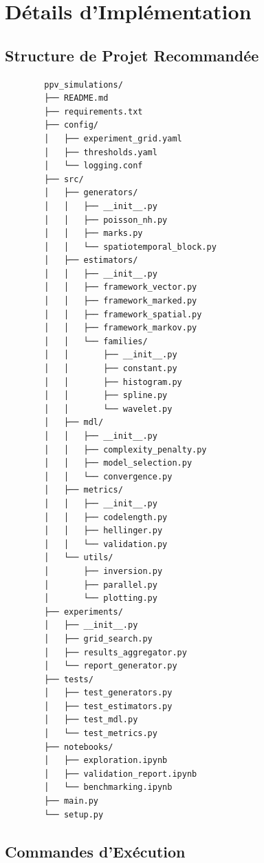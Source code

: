 \documentclass[12pt,a4paper]{article}
\begin{document}
	\section{Détails d'Implémentation}
	\label{sec:implementation}
	
	\subsection{Structure de Projet Recommandée}
	\label{subsec:structure_projet}
	
	\begin{verbatim}
		ppv_simulations/
		├── README.md
		├── requirements.txt
		├── config/
		│   ├── experiment_grid.yaml
		│   ├── thresholds.yaml
		│   └── logging.conf
		├── src/
		│   ├── generators/
		│   │   ├── __init__.py
		│   │   ├── poisson_nh.py
		│   │   ├── marks.py
		│   │   └── spatiotemporal_block.py
		│   ├── estimators/
		│   │   ├── __init__.py
		│   │   ├── framework_vector.py
		│   │   ├── framework_marked.py
		│   │   ├── framework_spatial.py
		│   │   ├── framework_markov.py
		│   │   └── families/
		│   │       ├── __init__.py
		│   │       ├── constant.py
		│   │       ├── histogram.py
		│   │       ├── spline.py
		│   │       └── wavelet.py
		│   ├── mdl/
		│   │   ├── __init__.py
		│   │   ├── complexity_penalty.py
		│   │   ├── model_selection.py
		│   │   └── convergence.py
		│   ├── metrics/
		│   │   ├── __init__.py
		│   │   ├── codelength.py
		│   │   ├── hellinger.py
		│   │   └── validation.py
		│   └── utils/
		│       ├── inversion.py
		│       ├── parallel.py
		│       └── plotting.py
		├── experiments/
		│   ├── __init__.py
		│   ├── grid_search.py
		│   ├── results_aggregator.py
		│   └── report_generator.py
		├── tests/
		│   ├── test_generators.py
		│   ├── test_estimators.py
		│   ├── test_mdl.py
		│   └── test_metrics.py
		├── notebooks/
		│   ├── exploration.ipynb
		│   ├── validation_report.ipynb
		│   └── benchmarking.ipynb
		├── main.py
		└── setup.py
	\end{verbatim}
	
	\subsection{Commandes d'Exécution}
	\label{subsec:commandes_execution}
	
\end{document}
